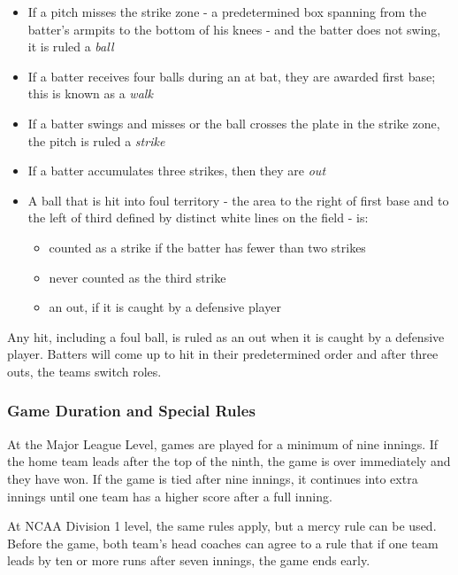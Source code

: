 \documentclass{article}
\begin{document}
\begin{itemize}
    \item If a pitch misses the strike zone - a predetermined box spanning from the batter's armpits to  the bottom of his knees - and the batter does not swing, it is ruled a \textit{ball}
    \item If a batter receives four balls during an at bat, they are awarded first base; this is known as a \textit{walk}

    \item If a batter swings and misses or the ball crosses the plate in the strike zone, the pitch is ruled a \textit{strike}
    \item If a batter accumulates three strikes, then they are \textit{out}

    \item A ball that is hit into foul territory - the area to the right of first base and to the left of third defined by distinct white lines on the field - is:

    \begin{itemize}
        \item counted as a strike if the batter has fewer than two strikes
        \item never counted as the third strike
        \item an out, if it is caught by a defensive player
    \end{itemize}
\end{itemize}

Any hit, including a foul ball, is ruled as an out when it is caught by a defensive player. Batters will come up to hit in their predetermined order and after three outs, the teams switch roles. 

\subsubsection{Game Duration and Special Rules}
At the Major League Level, games are played for a minimum of nine innings. If the home team leads after the top of the ninth, the game is over immediately and they have won. If the game is tied after nine innings, it continues into extra innings until one team has a higher score after a full inning. 

At NCAA Division 1 level, the same rules apply, but a mercy rule can be used. Before the game, both team's head coaches can agree to a rule that if one team leads by ten or more runs after seven innings, the game ends early. 
\end{document}
